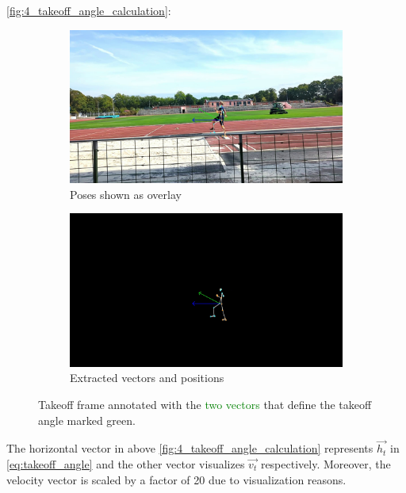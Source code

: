 \autoref{fig:4_takeoff_angle_calculation}:
\begin{figure}[!h]
    \centering
    \begin{subfigure}{0.45\textwidth}
        \includegraphics[scale=0.1]{takeoff_angle_overlay.jpg}
        \caption{Poses shown as overlay}
    \end{subfigure}
    \begin{subfigure}{0.45\textwidth}
        \includegraphics[scale=0.1]{takeoff_angle_no_overlay.jpg}
        \caption{Extracted vectors and positions}
    \end{subfigure}
    \caption[Takeoff angle]{Takeoff frame annotated with the
    \textcolor{green}{two vectors} that define the takeoff angle marked
    green.\\}
    \label{fig:4_takeoff_angle_calculation}
\end{figure}
\FloatBarrier
\noindent The horizontal vector in above \autoref{fig:4_takeoff_angle_calculation}
represents $\vec{h_t}$ in \autoref{eq:takeoff_angle} and the other vector
visualizes $\vec{v_t}$ respectively.
Moreover, the velocity vector is scaled by a factor of 20 due to visualization
reasons.\\

